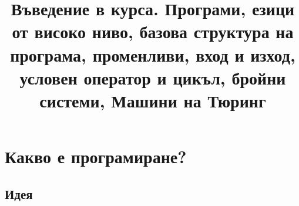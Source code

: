 \documentclass{beamer}
\begin{document}
\title[Увод в курса]{Въведение в курса. Програми, езици от високо ниво, базова структура на програма, променливи, вход и изход, условен оператор и цикъл, бройни системи, Машини на Тюринг}
\frame{\titlepage}

\section{Какво е програмиране?}
\subsection{Идея}



\end{document}
